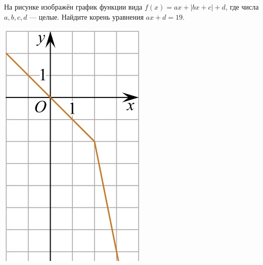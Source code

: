 \begin{class}[number=5]
\begin{listofex}
\begin{minipage}[c]{0.17\textwidth}
		\end{minipage}
		\item
		\begin{minipage}[t]{0.43\textwidth}
			На рисунке изображён график функции вида \(f(x)=ax+|bx+c|+d\), где числа \(a, b, c, d\) --- целые. Найдите корень уравнения \(ax+d=19\).
		\end{minipage}
		\begin{minipage}[c]{0.17\textwidth}
			\includegraphics[align=t, width=\textwidth]{pics/G101M4C5-9.jpg}
		\end{minipage}

\end{listofex}
\end{class}
